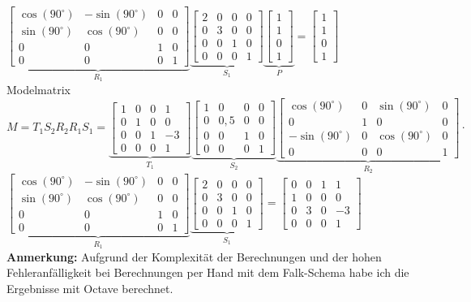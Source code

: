 \documentclass[11pt, a4paper]{article} %
\begin{document}
$\underbrace{\begin{bmatrix}
\cos(90^\circ) & -\sin(90^\circ) & 0 & 0 \\ \sin(90^\circ) & \cos(90^\circ) & 0 & 0 \\ 0 & 0 & 1 & 0 \\ 0 & 0 & 0 & 1
\end{bmatrix}}_{R_1} \underbrace{\begin{bmatrix}
2 & 0 & 0 & 0 \\ 0 & 3 & 0 & 0 \\ 0 & 0 & 1 & 0 \\ 0 & 0 & 0 & 1
\end{bmatrix}}_{S_1} \underbrace{\begin{bmatrix}
1 \\ 1 \\ 0 \\ 1
\end{bmatrix}}_{P} = \begin{bmatrix}
1 \\ 1 \\ 0 \\ 1
\end{bmatrix}$ \\
Modelmatrix $M = T_1S_2R_2R_1S_1 = \underbrace{\begin{bmatrix}
		1 & 0 & 0 & 1 \\ 0 & 1 & 0 & 0 \\ 0 & 0 & 1 & -3 \\ 0 & 0 & 0 & 1
\end{bmatrix}}_{T_1} \underbrace{\begin{bmatrix}
		1 & 0 & 0 & 0 \\ 0 & 0,5 & 0 & 0 \\ 0 & 0 & 1 & 0 \\ 0 & 0 & 0 & 1
\end{bmatrix}}_{S_2} \underbrace{\begin{bmatrix}
		\cos(90^\circ) & 0 & \sin(90^\circ) & 0 \\ 0 & 1 & 0 & 0 \\ -\sin(90^\circ) & 0 & \cos(90^\circ) & 0 \\ 0 & 0 & 0 & 1
\end{bmatrix}}_{R_2} \cdot$ \\
$\underbrace{\begin{bmatrix}
		\cos(90^\circ) & -\sin(90^\circ) & 0 & 0 \\ \sin(90^\circ) & \cos(90^\circ) & 0 & 0 \\ 0 & 0 & 1 & 0 \\ 0 & 0 & 0 & 1
\end{bmatrix}}_{R_1} \underbrace{\begin{bmatrix}
		2 & 0 & 0 & 0 \\ 0 & 3 & 0 & 0 \\ 0 & 0 & 1 & 0 \\ 0 & 0 & 0 & 1
\end{bmatrix}}_{S_1} = \begin{bmatrix}
0 & 0 & 1 & 1 \\ 1 & 0 & 0 & 0 \\ 0 & 3 & 0 & -3 \\ 0 & 0 & 0 & 1
\end{bmatrix}$ \\[1.0cm]
%
\textbf{Anmerkung:} Aufgrund der Komplexität der Berechnungen und der hohen Fehleranfälligkeit bei Berechnungen per Hand mit dem Falk-Schema habe ich die Ergebnisse mit Octave berechnet.
\end{document}
